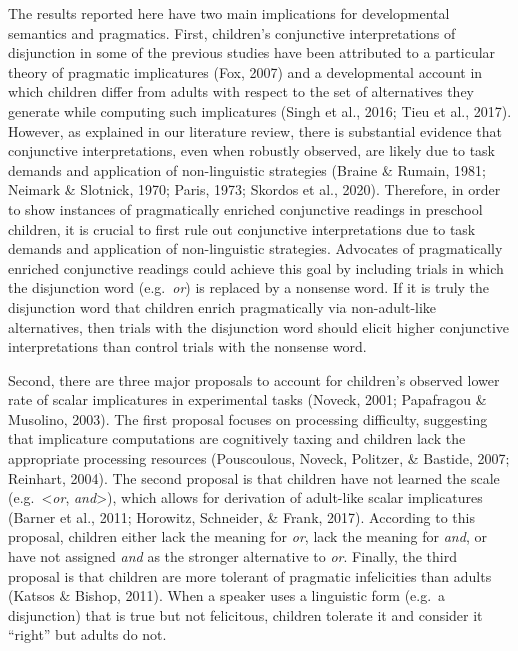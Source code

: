 \documentclass[
  english,
  ,man,floatsintext]{apa6}
\begin{document}
The results reported here have two main implications for developmental semantics and pragmatics. First, children's conjunctive interpretations of disjunction in some of the previous studies have been attributed to a particular theory of pragmatic implicatures (Fox, 2007) and a developmental account in which children differ from adults with respect to the set of alternatives they generate while computing such implicatures (Singh et al., 2016; Tieu et al., 2017). However, as explained in our literature review, there is substantial evidence that conjunctive interpretations, even when robustly observed, are likely due to task demands and application of non-linguistic strategies (Braine \& Rumain, 1981; Neimark \& Slotnick, 1970; Paris, 1973; Skordos et al., 2020). Therefore, in order to show instances of pragmatically enriched conjunctive readings in preschool children, it is crucial to first rule out conjunctive interpretations due to task demands and application of non-linguistic strategies. Advocates of pragmatically enriched conjunctive readings could achieve this goal by including trials in which the disjunction word (e.g.~\emph{or}) is replaced by a nonsense word. If it is truly the disjunction word that children enrich pragmatically via non-adult-like alternatives, then trials with the disjunction word should elicit higher conjunctive interpretations than control trials with the nonsense word.

Second, there are three major proposals to account for children's observed lower rate of scalar implicatures in experimental tasks (Noveck, 2001; Papafragou \& Musolino, 2003). The first proposal focuses on processing difficulty, suggesting that implicature computations are cognitively taxing and children lack the appropriate processing resources (Pouscoulous, Noveck, Politzer, \& Bastide, 2007; Reinhart, 2004). The second proposal is that children have not learned the scale (e.g.~\textless{}\emph{or}, \emph{and}\textgreater), which allows for derivation of adult-like scalar implicatures (Barner et al., 2011; Horowitz, Schneider, \& Frank, 2017). According to this proposal, children either lack the meaning for \emph{or}, lack the meaning for \emph{and}, or have not assigned \emph{and} as the stronger alternative to \emph{or}. Finally, the third proposal is that children are more tolerant of pragmatic infelicities than adults (Katsos \& Bishop, 2011). When a speaker uses a linguistic form (e.g.~a disjunction) that is true but not felicitous, children tolerate it and consider it \enquote{right} but adults do not.
\end{document}
